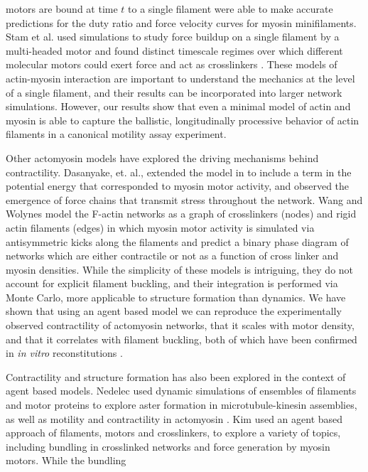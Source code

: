 \documentclass[12pt]{article}
\begin{document}
motors are bound at time $t$ to a single filament\cite{erdmann2012} were able to
make accurate predictions for the duty ratio and force velocity curves for
myosin minifilaments. Stam et al. used simulations to study force buildup on a
single filament by a multi-headed motor and found distinct timescale regimes
over which different molecular motors could exert force and act as crosslinkers
\cite{stam2015}. These models of actin-myosin interaction are important to
understand the mechanics at the level of a single filament, and their results
can be incorporated into larger network simulations. However, our results show
that even a minimal model of actin and myosin is able to capture the ballistic, 
longitudinally processive behavior of actin filaments in a canonical motility 
assay experiment. 
\par
Other actomyosin models have explored the driving mechanisms behind
contractility. Dasanyake, et. al., extended the model in \cite{head2003} to
include a term in the potential energy that corresponded to myosin motor
activity, and observed the emergence of force chains that transmit stress
throughout the network\cite{dasanyake2011}. Wang and Wolynes \cite{wang2012}
model the F-actin networks as a graph of crosslinkers (nodes) and rigid actin
filaments (edges) in which myosin motor activity is simulated via antisymmetric
kicks along the filaments and predict a binary phase diagram of networks which
are either contractile or not as a function of cross linker and myosin
densities. While the simplicity of these models is intriguing, they do not
account for explicit filament buckling, and their integration is performed via
Monte Carlo, more applicable to structure formation than dynamics.
We have shown that using an agent based model we can reproduce the
experimentally observed contractility of actomyosin networks, that it scales
with motor density, and that it correlates with filament buckling, both of which
have been confirmed in {\em in vitro} reconstitutions \cite{murrell2012,murrell2014}.
\par
Contractility and structure formation has also been explored in the context of
agent based models. Nedelec used dynamic simulations of ensembles of filaments
and motor proteins to explore aster formation in microtubule-kinesin assemblies,
as well as motility and contractility in actomyosin
\cite{nedelec2002,nedelec2007,ennomani2016}. 
Kim used an agent based approach of filaments, motors and crosslinkers, to
explore a variety of topics, including bundling in crosslinked networks and
force generation by myosin motors\cite{kim2009b, kim2014}. While the bundling
\end{document}
